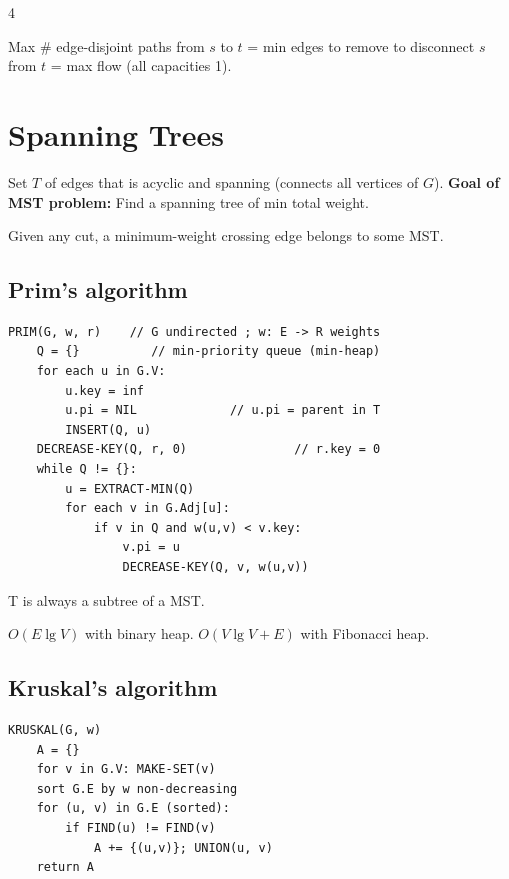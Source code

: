\documentclass[8pt,a4paper,landscape]{extarticle}
\begin{document}
\begin{multicols*}{4}
\begin{prop}[title=Edge-disjoint paths]
Max \# edge-disjoint paths from $s$ to $t$ = min edges to remove to disconnect $s$ from $t$ = max flow (all capacities 1).
\end{prop}


\section{Spanning Trees}

\begin{defn}[title=Definition]
Set $T$ of edges that is acyclic and spanning (connects all vertices of $G$).
\textbf{Goal of MST problem: }Find a spanning tree of min total weight.
\end{defn}

\begin{thm}[title=Cut property (safe edge)]
Given any cut, a minimum-weight crossing edge belongs to some MST.
\end{thm}

\subsection{Prim's algorithm}
\begin{lstlisting}
PRIM(G, w, r)    // G undirected ; w: E -> R weights
    Q = {}          // min-priority queue (min-heap)
    for each u in G.V:
        u.key = inf
        u.pi = NIL             // u.pi = parent in T
        INSERT(Q, u)
    DECREASE-KEY(Q, r, 0)               // r.key = 0
    while Q != {}:
        u = EXTRACT-MIN(Q)
        for each v in G.Adj[u]:
            if v in Q and w(u,v) < v.key:
                v.pi = u
                DECREASE-KEY(Q, v, w(u,v))
\end{lstlisting}

\begin{thm}[title=Why does it work?]
T is always a subtree of a MST.
\end{thm}

\begin{prop}[title=Prim's runtime]
$O(E\lg V)$ with binary heap. $O(V\lg V+E)$ with Fibonacci heap.
\end{prop}

\subsection{Kruskal's algorithm}
\begin{lstlisting}
KRUSKAL(G, w)
    A = {}
    for v in G.V: MAKE-SET(v)
    sort G.E by w non-decreasing
    for (u, v) in G.E (sorted):
        if FIND(u) != FIND(v)
            A += {(u,v)}; UNION(u, v)
    return A
\end{lstlisting}


\end{multicols*}
\end{document}
